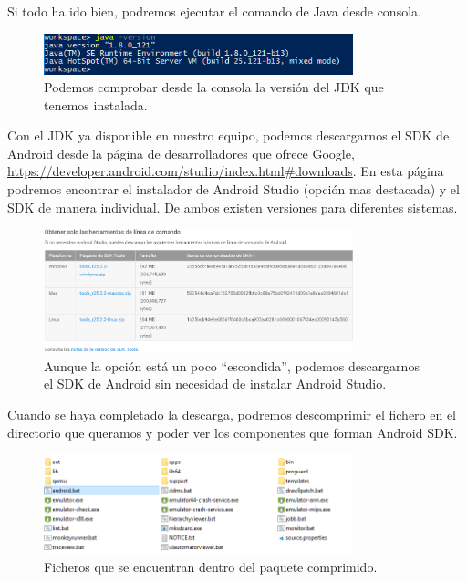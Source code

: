 Si todo ha ido bien, podremos ejecutar el comando de Java desde consola.

\begin{figure}[H]
\centering
  \includegraphics[width=0.8\textwidth]{Figures/anexo/android_tools/jdk_check}
  \caption{Podemos comprobar desde la consola la versión del \gls{JDK} que tenemos instalada.}
\end{figure}

Con el \gls{JDK} ya disponible en nuestro equipo, podemos descargarnos el \gls{SDK} de Android desde la página de desarrolladores que ofrece Google, \url{https://developer.android.com/studio/index.html#downloads}. En esta página podremos encontrar el instalador de Android Studio (opción mas destacada) y el \gls{SDK} de manera individual. De ambos existen versiones para diferentes sistemas.

\begin{figure}[H]
\centering
  \includegraphics[width=0.8\textwidth]{Figures/anexo/android_tools/sdk_download}
  \caption{Aunque la opción está un poco ``escondida'', podemos descargarnos el \gls{SDK} de Android sin necesidad de instalar Android Studio.}
\end{figure}

Cuando se haya completado la descarga, podremos descomprimir el fichero en el directorio que queramos y poder ver los componentes que forman Android \gls{SDK}.

\begin{figure}[H]
\centering
  \includegraphics[width=0.8\textwidth]{Figures/anexo/android_tools/sdk_uncompressed}
  \caption{Ficheros que se encuentran dentro del paquete comprimido.}
\end{figure}

